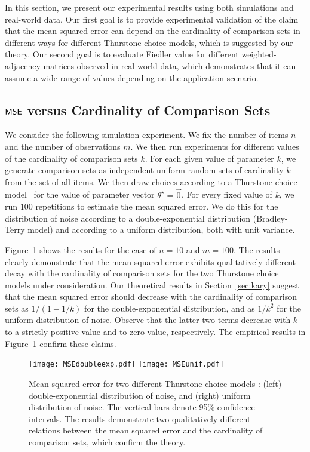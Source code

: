 In this section, we present our experimental results using both simulations and real-world data. Our first goal is to provide experimental validation of the claim that the mean squared error can depend on the cardinality of comparison sets in different ways for different Thurstone choice models, which is suggested by our theory. Our second goal is to evaluate Fiedler value for different weighted-adjacency matrices observed in real-world data, which demonstrates that it can assume a wide range of values depending on the application scenario. 

\subsection{$\hbox{\textup{\textsf{MSE}}}$ versus Cardinality of Comparison Sets}

We consider the following simulation experiment. We fix the number of items $n$ and the number of observations $m$. We then run experiments for different values of the cardinality of comparison sets $k$. For each given value of parameter $k$, we generate comparison sets as independent uniform random sets of cardinality $k$ from the set of all items. We then draw choices according to a Thurstone choice model \GT\ for the value of parameter vector $\theta^\star = \vec{0}$. For every fixed value of $k$, we run $100$ repetitions to estimate the mean squared error. We do this for the distribution of noise according to a double-exponential distribution (Bradley-Terry model) and according to a uniform distribution, both with unit variance.

Figure~\ref{fig:synt} shows the results for the case of $n = 10$ and $m = 100$. The results clearly demonstrate that the mean squared error exhibits qualitatively different decay with the cardinality of comparison sets for the two Thurstone choice models under consideration. Our theoretical results in Section~\ref{sec:kary} suggest that the mean squared error should decrease with the cardinality of comparison sets as $1/(1-1/k)$ for the double-exponential distribution, and as $1/k^2$ for the uniform distribution of noise. Observe that the latter two terms decrease with $k$ to a strictly positive value and to zero value, respectively. The empirical results in Figure~\ref{fig:synt} confirm these claims. 

\begin{figure}[t]
\centering
\vspace*{-1.85cm}
\texttt{[image: MSEdoubleexp.pdf]}
\texttt{[image: MSEunif.pdf]}
\vspace*{-2cm}
\caption{Mean squared error for two different Thurstone choice models \GT: (left) double-exponential distribution of noise, and (right) uniform distribution of noise. The vertical bars denote 95\% confidence intervals. The results demonstrate two qualitatively different relations between the mean squared error and the cardinality of comparison sets, which confirm the theory.}
\label{fig:synt}
\end{figure}

